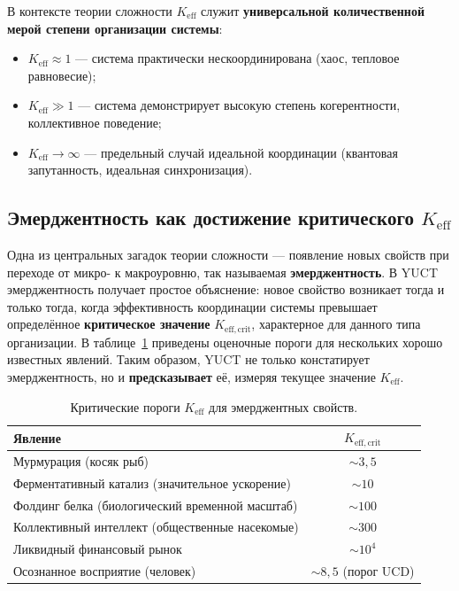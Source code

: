 \documentclass[11pt]{article}
\theoremstyle{remark}
\newcommand{\Keff}{K_{\mathrm{eff}}}
\newcommand{\Keffcrit}{K_{\mathrm{eff},\text{crit}}}
\begin{document}
	В контексте теории сложности \(\Keff\) служит \textbf{универсальной количественной мерой степени организации системы}:
	\begin{itemize}
		\item \(\Keff \approx 1\) — система практически нескоординирована (хаос, тепловое равновесие);
		\item \(\Keff \gg 1\) — система демонстрирует высокую степень когерентности, коллективное поведение;
		\item \(\Keff \to \infty\) — предельный случай идеальной координации (квантовая запутанность, идеальная синхронизация).
	\end{itemize}
	
	\subsection{Эмерджентность как достижение критического \(\Keff\)}
	
	Одна из центральных загадок теории сложности — появление новых свойств при переходе от микро- к макроуровню, так называемая \textbf{эмерджентность}. В YUCT эмерджентность получает простое объяснение: новое свойство возникает тогда и только тогда, когда эффективность координации системы превышает определённое \textbf{критическое значение} \(\Keffcrit\), характерное для данного типа организации. В таблице~\ref{tab:thresholds} приведены оценочные пороги для нескольких хорошо известных явлений. Таким образом, YUCT не только констатирует эмерджентность, но и \textbf{предсказывает} её, измеряя текущее значение \(\Keff\).
	
	\begin{table}[H]
		\centering
		\caption{Критические пороги \(\Keff\) для эмерджентных свойств.}
		\label{tab:thresholds}
		\begin{tabular}{l c}
			\toprule
			\textbf{Явление} & \(\Keffcrit\) \\
			\midrule
			Мурмурация (косяк рыб) & \(\sim 3,5\) \\
			Ферментативный катализ (значительное ускорение) & \(\sim 10\) \\
			Фолдинг белка (биологический временной масштаб) & \(\sim 100\) \\
			Коллективный интеллект (общественные насекомые) & \(\sim 300\) \\
			Ликвидный финансовый рынок & \(\sim 10^4\) \\
			Осознанное восприятие (человек) & \(\sim 8,5\) (порог UCD) \\
			\bottomrule
		\end{tabular}
	\end{table}
	
\end{document}

